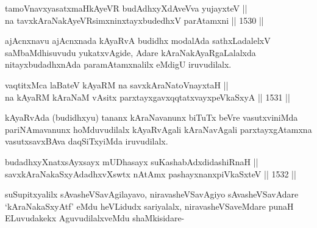 \begin{shl}
tamoVnavxyasatxmaHkAyeVR budAdhxyXdAveVva yujayxteV || \\
na tavxkAraNakAyeVR\s simxninxtayxbudedhxV parAtamxni ||  1530 ||  
\end{shl}

\begin{artha}
ajAcnxnavu ajAcnxnada kAyaRvA budidhx modalAda sathxLadalelxV saMbaMdhisuvudu yukatxvAgide, Adare kAraNakAyaRgaLalalxda nitayxbudadhxnAda paramAtamxnalilx eMdigU iruvudilalx.
\end{artha}

\begin{shl}
vaqtitxM\footnotemark[1] ca laBateV kAyaRM na savxkAraNatoV\s nayxtaH ||  \\
na kAyaRM kAraNaM vA\s sitx parxtayxgavxqqtatxvayxpeVkaSxyA ||  1531 ||  
\end{shl}

\begin{artha}
kAyaRvAda (budidhxyu) tananx kAraNavanunx biTuTx beVre vasutxviniMda pariNAmavanunx hoMduvudilalx kAyaRvAgali kAraNavAgali parxtayxgAtamxna vasutxsavxBAva daqSiTxyiMda iruvudilalx.
\end{artha}

\begin{shl}
budadhxyXnatxsAyxsayx mUDhasayx suKashabAdxdidashiRnaH || \\
savxkAraNakaSxyAdadhxvXswtx nA\s \s tAmx pashayxnanxpiVkaSxteV ||  1532 ||  
\end{shl}
				
\begin{artha}
suSupitxyalilx sAvasheVSavAgilayavo, niravasheVSavAgiyo sAvasheVSavAdare `kAraNakaSxyAtf' eMdu heVLidudx sariyalalx, niravasheVSaveMdare punaH ELuvudakekx AguvudilalxveMdu shaMkisidare-
\end{artha}

